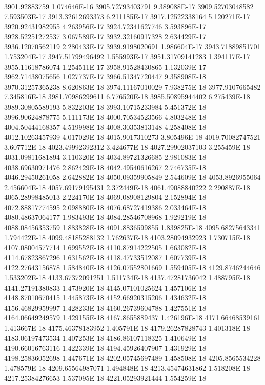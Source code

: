 3901.92883759  1.074646E-16
3905.72793403791  9.389088E-17
3909.52703048582  7.593503E-17
3913.32612693373  6.211185E-17
3917.12522338164  5.120271E-17
3920.92431982955  4.263956E-17
3924.72341627746  3.593896E-17
3928.52251272537  3.067589E-17
3932.32160917328  2.634429E-17
3936.12070562119  2.280433E-17
3939.9198020691  1.986604E-17
3943.71889851701  1.753204E-17
3947.51799496492  1.555993E-17
3951.31709141283  1.394117E-17
3955.11618786074  1.254511E-17
3958.91528430865  1.132039E-17
3962.71438075656  1.027737E-17
3966.51347720447  9.358908E-18
3970.31257365238  8.620863E-18
3974.11167010029  7.938275E-18
3977.9107665482  7.345816E-18
3981.70986299611  6.776520E-18
3985.50895944402  6.275439E-18
3989.30805589193  5.832203E-18
3993.10715233984  5.451372E-18
3996.90624878775  5.111173E-18
4000.70534523566  4.803248E-18
4004.50444168357  4.519998E-18
4008.30353813148  4.258408E-18
4012.10263457939  4.017029E-18
4015.9017310273  3.805496E-18
4019.70082747521  3.607712E-18
4023.49992392312  3.424677E-18
4027.29902037103  3.255459E-18
4031.09811681894  3.110320E-18
4034.89721326685  2.981083E-18
4038.69630971476  2.862429E-18
4042.49540616267  2.746735E-18
4046.29450261058  2.642882E-18
4050.09359905849  2.544609E-18
4053.8926955064  2.456604E-18
4057.69179195431  2.372449E-18
4061.49088840222  2.290887E-18
4065.28998485013  2.224170E-18
4069.08908129804  2.152894E-18
4072.88817774595  2.098880E-18
4076.68727419386  2.033464E-18
4080.48637064177  1.983493E-18
4084.28546708968  1.929219E-18
4088.08456353759  1.883828E-18
4091.8836599855  1.839825E-18
4095.68275643341  1.794422E-18
4099.48185288132  1.762637E-18
4103.28094932923  1.730715E-18
4107.08004577714  1.699552E-18
4110.87914222505  1.663082E-18
4114.67823867296  1.631562E-18
4118.47733512087  1.607739E-18
4122.27643156878  1.584840E-18
4126.07552801669  1.559405E-18
4129.8746244646  1.533202E-18
4133.67372091251  1.511734E-18
4137.47281736042  1.488795E-18
4141.27191380833  1.473920E-18
4145.07101025624  1.457106E-18
4148.87010670415  1.445873E-18
4152.66920315206  1.434632E-18
4156.46829959997  1.428233E-18
4160.26739604788  1.427551E-18
4164.06649249579  1.429155E-18
4167.8655889437  1.426196E-18
4171.66468539161  1.413667E-18
4175.46378183952  1.405791E-18
4179.26287828743  1.401318E-18
4183.06197473534  1.407253E-18
4186.86107118325  1.410649E-18
4190.66016763116  1.422339E-18
4194.45926407907  1.431929E-18
4198.25836052698  1.447671E-18
4202.05745697489  1.458508E-18
4205.8565534228  1.478579E-18
4209.65564987071  1.494848E-18
4213.45474631862  1.518208E-18
4217.25384276653  1.537095E-18
4221.05293921444  1.554259E-18
